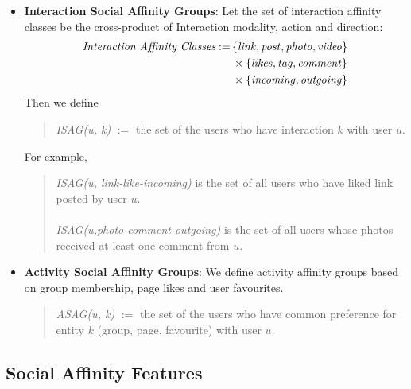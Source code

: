 \begin{itemize}
  \item \textbf{Interaction Social Affinity Groups}: Let the set of
  interaction affinity classes be the cross-product of Interaction
  modality, action and direction:
  \begin{align*}
  	\textit{Interaction Affinity Classes} := \, & \{\link, \post, \photo, \video\} \\
                                                & \times \{\like, \ttag, \comment\} \\
                                                & \times \{\incoming, \outgoing\}
  \end{align*}
  Then we define 
  \begin{quote}
     \textit{ISAG(u, k)} $:=$ the set of the users who have interaction $k$ with user $u$.
     \end{quote}
  For example,
  \begin{quote}
     \textit{ISAG(u, link-like-incoming)} is the set of all users who
     have liked link posted by user $u$. \\ 
     \\ 
     \textit{ISAG(u,photo-comment-outgoing)} is the set of all users whose photos
     received at least one comment from $u$.  
  \end{quote}
\item \textbf{Activity Social Affinity Groups}: We define activity affinity groups based on group membership, page likes and user favourites.
  \begin{quote} \textit{ASAG(u, k)} $:=$ the set of the users
	who have common preference for entity $k$ (group, page,
	favourite) with user $u$.  \end{quote}
\end{itemize}


\subsection{Social Affinity Features}
\label{ssec:SAfeature}

